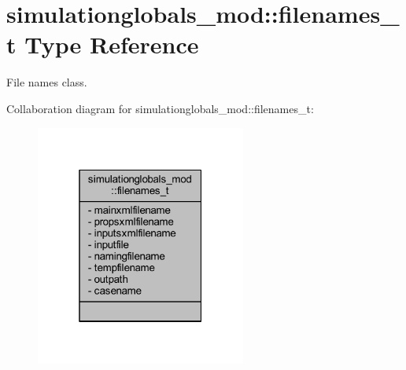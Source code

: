 \hypertarget{structsimulationglobals__mod_1_1filenames__t}{}\section{simulationglobals\+\_\+mod\+:\+:filenames\+\_\+t Type Reference}
\label{structsimulationglobals__mod_1_1filenames__t}


File names class.  




Collaboration diagram for simulationglobals\+\_\+mod\+:\+:filenames\+\_\+t\+:\nopagebreak
\begin{figure}[H]
\begin{center}
\leavevmode
\includegraphics[width=196pt]{structsimulationglobals__mod_1_1filenames__t__coll__graph}
\end{center}
\end{figure}
